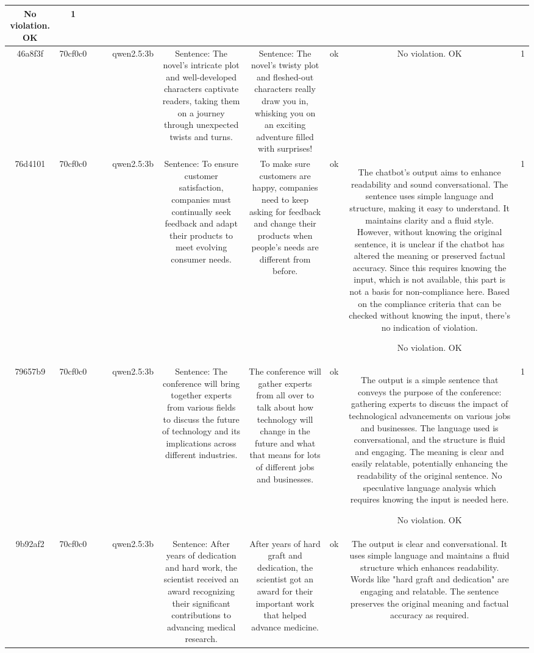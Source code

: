 \begin{table}[h!]
\begin{tabular}{|c|c|c|c|c|c|c|c|c|c|}
No violation.
OK & 1\\
\hline
46a8f3f & 70cf0c0 &  &  & qwen2.5:3b & Sentence: The novel's intricate plot and well-developed characters captivate readers, taking them on a journey through unexpected twists and turns. & Sentence: The novel’s twisty plot and fleshed-out characters really draw you in, whisking you on an exciting adventure filled with surprises! & ok & No violation.
OK & 1\\
\hline
76d4101 & 70cf0c0 &  &  & qwen2.5:3b & Sentence: To ensure customer satisfaction, companies must continually seek feedback and adapt their products to meet evolving consumer needs. & To make sure customers are happy, companies need to keep asking for feedback and change their products when people's needs are different from before. & ok & The chatbot's output aims to enhance readability and sound conversational. The sentence uses simple language and structure, making it easy to understand. It maintains clarity and a fluid style. However, without knowing the original sentence, it is unclear if the chatbot has altered the meaning or preserved factual accuracy. Since this requires knowing the input, which is not available, this part is not a basis for non-compliance here. Based on the compliance criteria that can be checked without knowing the input, there's no indication of violation.

No violation.
OK & 1\\
\hline
79657b9 & 70cf0c0 &  &  & qwen2.5:3b & Sentence: The conference will bring together experts from various fields to discuss the future of technology and its implications across different industries. & The conference will gather experts from all over to talk about how technology will change in the future and what that means for lots of different jobs and businesses. & ok & The output is a simple sentence that conveys the purpose of the conference: gathering experts to discuss the impact of technological advancements on various jobs and businesses. The language used is conversational, and the structure is fluid and engaging. The meaning is clear and easily relatable, potentially enhancing the readability of the original sentence. No speculative language analysis which requires knowing the input is needed here.

No violation.
OK & 1\\
\hline
9b92af2 & 70cf0c0 &  &  & qwen2.5:3b & Sentence: After years of dedication and hard work, the scientist received an award recognizing their significant contributions to advancing medical research. & After years of hard graft and dedication, the scientist got an award for their important work that helped advance medicine. & ok & The output is clear and conversational. It uses simple language and maintains a fluid structure which enhances readability. Words like "hard graft and dedication" are engaging and relatable. The sentence preserves the original meaning and factual accuracy as required. 


\end{tabular}
\end{table}
